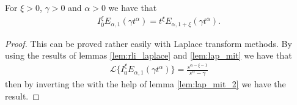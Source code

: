\begin{mdframed}[innertopmargin=10pt]
\begin{lemma}
\label{lem-rli-mit-lef-1}
For $ \xi > 0 $, $ \gamma > 0 $ and $ \alpha > 0 $ we have that
	\begin{align*}
		{I}^\xi_0 E_{\alpha,1}(\gamma t^\alpha) = t^\xi E_{\alpha,1+\xi}(\gamma t^\alpha).
	\end{align*}
\end{lemma}
\end{mdframed}
\begin{proof}
	This can be proved rather easily with Laplace transform methods.
	By using the results of lemmas \ref{lem:rli_laplace} and \ref{lem:lap_mit} we have that
	\begin{align}
	    \mathcal{L}\{ I_0^\xi E_{\alpha, 1}(\gamma t^\alpha) \} = \frac{s^{\alpha-\xi-1}}{s^\alpha - \gamma}
	\end{align}
	then by inverting the with the help of lemma \ref{lem:lap_mit_2} we have the result.
\end{proof}

